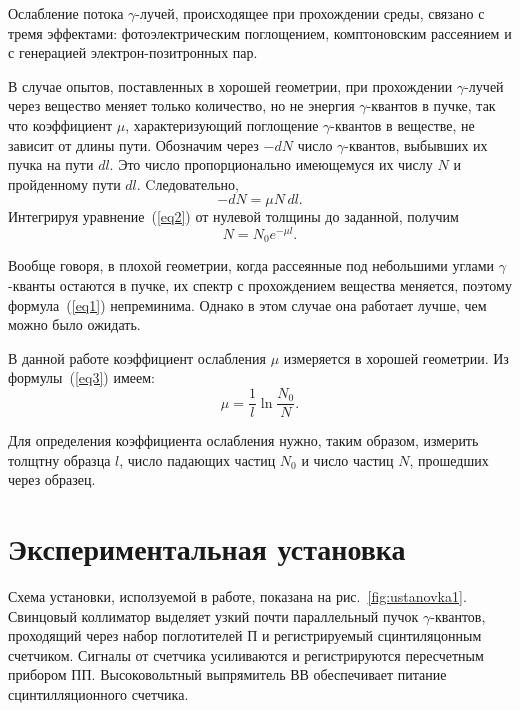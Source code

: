 \documentclass[a4paper,12pt]{article} %
\begin{document}
	Ослабление потока $\gamma$-лучей, происходящее при прохождении среды, связано с тремя эффектами: фотоэлектрическим поглощением, комптоновским рассеянием и с генерацией электрон-позитронных пар.
	
	В случае опытов, поставленных в хорошей геометрии, при прохождении $\gamma$-лучей через вещество меняет только количество, но не энергия $\gamma$-квантов в пучке, так что коэффициент $\mu$, характеризующий поглощение $\gamma$-квантов в веществе, не зависит от длины пути. Обозначим через $-dN$ число $\gamma$-квантов, выбывших их пучка на пути $dl$. Это число пропорционально имеющемуся их числу $N$ и пройденному пути $dl$. Cледовательно,
	\begin{equation}
		\label{eq2}
		-dN = \mu N \, dl.
	\end{equation} 
	Интегрируя уравнение~(\ref{eq2}) от нулевой толщины до заданной, получим
	\begin{equation}
		\label{eq3}
		N = N_0 e^{-\mu l}.
	\end{equation}

	Вообще говоря, в плохой геометрии, когда рассеянные под небольшими углами $\gamma$-кванты остаются в пучке, их спектр с прохождением вещества меняется, поэтому формула~(\ref{eq1}) непреминима. Однако в этом случае она работает лучше, чем можно было ожидать.
	
	В данной работе коэффициент ослабления $\mu$ измеряется в хорошей геометрии. Из формулы~(\ref{eq3}) имеем:
	\begin{equation}
		\tag{$\star$}
		\label{formula}
		\mu = \frac{1}{l} \ln \frac{N_0}{N}.
	\end{equation}

	Для определения коэффициента ослабления нужно, таким образом, измерить толщтну образца $l$, число падающих частиц $N_0$ и число частиц $N$, прошедших через образец.
	
\newpage
\section{Экспериментальная установка}
	Схема установки, исползуемой в работе, показана на рис.~\ref{fig:ustanovka1}. Свинцовый коллиматор выделяет узкий почти параллельный пучок $\gamma$-квантов, проходящий через набор поглотителей П и регистрируемый сцинтиляцонным счетчиком. Сигналы от счетчика усиливаются и регистрируются пересчетным прибором ПП. Высоковольтный выпрямитель ВВ обеспечивает питание сцинтилляционного счетчика.
	
\end{document}
